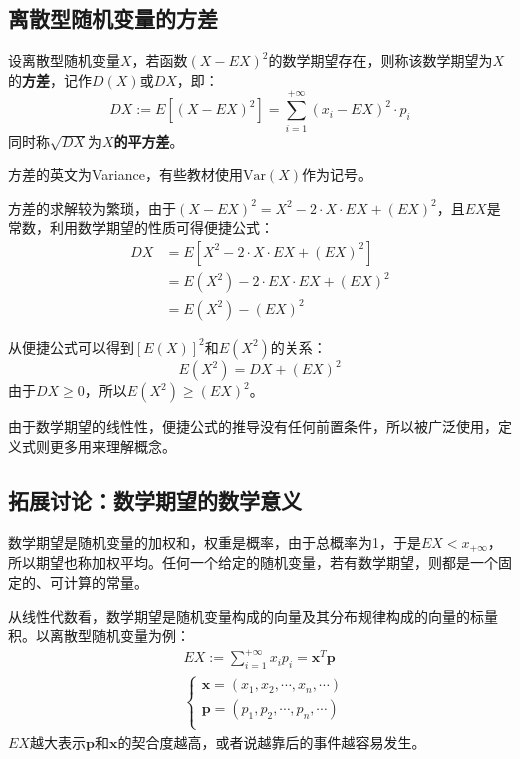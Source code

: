 \subsection{离散型随机变量的方差}

\begin{definition}[方差]
设离散型随机变量$X$，若函数$\left( X-EX \right) ^2$的数学期望存在，则称该数学期望为$X$的{\bf 方差}，记作$D\left( X \right) $或$DX$，即：
\[
DX:=E\left[ \left( X-EX \right) ^2 \right] =\sum_{i=1}^{+\infty}{\left( x_i-EX \right) ^2\cdot p_i}
\]
同时称$\sqrt{DX}$为{\bf $X$的平方差}。
\end{definition}

\begin{tcolorbox}
方差的英文为Variance，有些教材使用$\mathrm{Var}\left( X \right) $作为记号。
\end{tcolorbox}

方差的求解较为繁琐，由于$\left( X-EX \right) ^2=X^2-2\cdot X\cdot EX+\left( EX \right) ^2$，且$EX$是常数，利用数学期望的性质可得便捷公式：
\begin{align*}
DX&=E\left[ X^2-2\cdot X\cdot EX+\left( EX \right) ^2 \right] \\
&=E\left( X^2 \right) -2\cdot EX\cdot EX+\left( EX \right) ^2 \\
&=E\left( X^2 \right) -\left( EX \right) ^2
\end{align*}

从便捷公式可以得到$\left[ E\left( X \right) \right] ^2$和$E\left( X^2 \right) $的关系：
\[
E\left( X^2 \right) =DX+\left( EX \right) ^2
\]
由于$DX\geqslant 0$，所以$E\left( X^2 \right) \geqslant \left( EX \right) ^2$。

\begin{tcolorbox}
由于数学期望的线性性，便捷公式的推导没有任何前置条件，所以被广泛使用，定义式则更多用来理解概念。
\end{tcolorbox}

\subsection{拓展讨论：数学期望的数学意义}

数学期望是随机变量的加权和，权重是概率，由于总概率为1，于是$EX<x_{+\infty}$，所以期望也称加权平均。任何一个给定的随机变量，若有数学期望，则都是一个固定的、可计算的常量。

从线性代数看，数学期望是随机变量构成的向量及其分布规律构成的向量的标量积。以离散型随机变量为例：
\begin{align*}
&EX:=\sum_{i=1}^{+\infty}{x_ip_i}=\boldsymbol{x}^T\boldsymbol{p} \\
&\begin{cases}
	\boldsymbol{x}=\left( x_1,x_2,\cdots ,x_n,\cdots \right)\\
	\boldsymbol{p}=\left( p_1,p_2,\cdots ,p_n,\cdots \right)\\
\end{cases}
\end{align*}
$EX$越大表示$\boldsymbol{p}$和$\boldsymbol{x}$的契合度越高，或者说越靠后的事件越容易发生。

